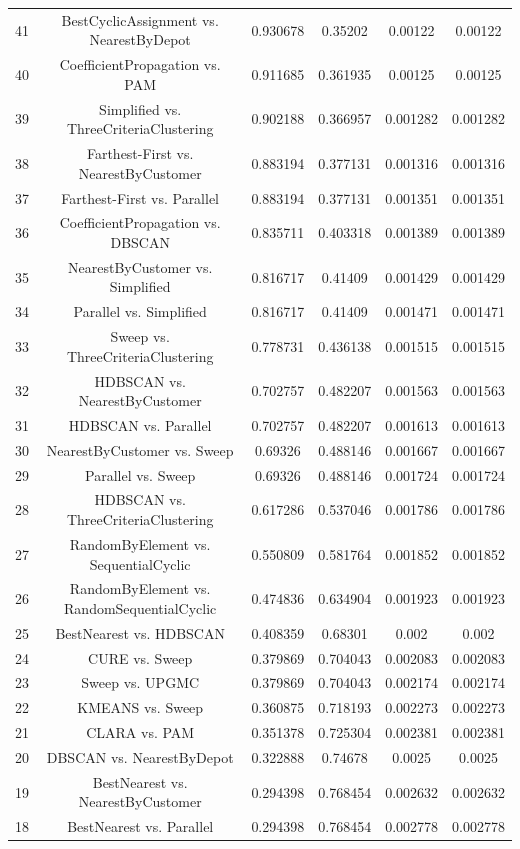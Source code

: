 \documentclass[a4paper,10pt]{article}
\begin{document}
\begin{landscape}
\begin{table}[!htp]
\begin{tabular}{cccccc}
41&BestCyclicAssignment vs. NearestByDepot&0.930678&0.35202&0.00122&0.00122\\
40&CoefficientPropagation vs. PAM&0.911685&0.361935&0.00125&0.00125\\
39&Simplified vs. ThreeCriteriaClustering&0.902188&0.366957&0.001282&0.001282\\
38&Farthest-First vs. NearestByCustomer&0.883194&0.377131&0.001316&0.001316\\
37&Farthest-First vs. Parallel&0.883194&0.377131&0.001351&0.001351\\
36&CoefficientPropagation vs. DBSCAN&0.835711&0.403318&0.001389&0.001389\\
35&NearestByCustomer vs. Simplified&0.816717&0.41409&0.001429&0.001429\\
34&Parallel vs. Simplified&0.816717&0.41409&0.001471&0.001471\\
33&Sweep vs. ThreeCriteriaClustering&0.778731&0.436138&0.001515&0.001515\\
32&HDBSCAN vs. NearestByCustomer&0.702757&0.482207&0.001563&0.001563\\
31&HDBSCAN vs. Parallel&0.702757&0.482207&0.001613&0.001613\\
30&NearestByCustomer vs. Sweep&0.69326&0.488146&0.001667&0.001667\\
29&Parallel vs. Sweep&0.69326&0.488146&0.001724&0.001724\\
28&HDBSCAN vs. ThreeCriteriaClustering&0.617286&0.537046&0.001786&0.001786\\
27&RandomByElement vs. SequentialCyclic&0.550809&0.581764&0.001852&0.001852\\
26&RandomByElement vs. RandomSequentialCyclic&0.474836&0.634904&0.001923&0.001923\\
25&BestNearest vs. HDBSCAN&0.408359&0.68301&0.002&0.002\\
24&CURE vs. Sweep&0.379869&0.704043&0.002083&0.002083\\
23&Sweep vs. UPGMC&0.379869&0.704043&0.002174&0.002174\\
22&KMEANS vs. Sweep&0.360875&0.718193&0.002273&0.002273\\
21&CLARA vs. PAM&0.351378&0.725304&0.002381&0.002381\\
20&DBSCAN vs. NearestByDepot&0.322888&0.74678&0.0025&0.0025\\
19&BestNearest vs. NearestByCustomer&0.294398&0.768454&0.002632&0.002632\\
18&BestNearest vs. Parallel&0.294398&0.768454&0.002778&0.002778\\

\end{tabular}
\end{table}
\end{landscape}
\end{document}
